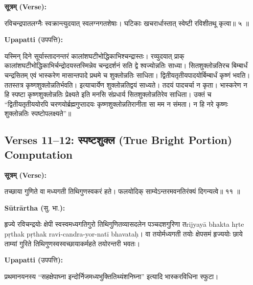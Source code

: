 \documentclass[11pt,a4paper]{article}
\newcommand{\dev}[1]{{\devanagarifont #1}}
\newcommand{\arth}{\textbf{Sūtrārtha (}\dev{सु. भा.}\textbf{):}\ }
\newcommand{\upapatti}{\textbf{Upapatti (}\dev{उपपत्ति}\textbf{):}\ }
\newenvironment{sanskritverse}{%
  \begin{center}\begin{minipage}{0.9\textwidth}
  \setlength{\leftskip}{1em}
  \setlength{\rightskip}{1em}
  \dev
}{\end{minipage}\end{center}}
\begin{document}
\vspace{0.5em}
\noindent\textbf{\dev{सूत्रम् (Verse):}}
\begin{sanskritverse}
रविचन्द्रपातलग्नैः स्वक्रान्त्युदयात् स्वलग्नगतशेषाः।
घटिकाः खचरार्धास्तात् स्वेष्टी रविशीतथू कृत्वा॥ ५ ॥
\end{sanskritverse}

\noindent\upapatti
\begin{sanskritverse}
यस्मिन् दिने सूर्यास्तादनन्तरं कालांशघटीभोद्धिकाभिश्चन्द्रास्तः। रव्युदयात् प्राक्
कालांशघटीभोद्धिकाभिर्चन्द्रोदयस्तस्मिन्नेव चन्द्रदर्शनं सति द्वे श्वज्योन्नतिः साध्या।
सितशुक्लोन्नतिरच बिम्बार्धं चन्द्रसितम् एवं भास्करेण मासान्तपादे प्रथमे च
शुक्लोन्नतिः साधिता। द्वितीयतृतीयपादयोर्बिम्बार्धं कृष्णं भवति। ततस्तत्र
कृष्णशुक्लोन्नतिर्भवति। इत्याचार्येण शुक्लोन्नतिद्वयं साध्यते। तदयं पादचर्चा न
कृता। भास्करेण न हि स्पष्टा कृष्णशुक्लोन्नतिः प्रेक्ष्यते इति मनसि संप्रधार्य
सितशुक्लोन्नतिरेव साधिता। उक्तं च ``द्वितीयतृतीययोरपि चरणयोर्ब्रह्मगुप्तादयः कृष्णशुक्लोन्नतिरानीता सा मम न संमता। न हि नरे कृष्णः शुक्लोन्नतिः स्पष्टोपलक्ष्यते''॥
\end{sanskritverse}

\subsection{Verses 11--12: \dev{स्पष्टशुक्ल} (True Bright Portion) Computation}

\vspace{0.5em}
\noindent\textbf{\dev{सूत्रम् (Verse):}}
\begin{sanskritverse}
तच्छाया गुणिते वा मध्यगती तिथिगुणस्वकरं हते।
फलयोदिक् साम्येऽन्तरमवनतिरंक्यं दिगन्यत्वे॥ ११ ॥
\end{sanskritverse}

\noindent\arth
\begin{sanskritverse}
हृज्ये रविचन्द्रयोः क्षेपी स्वस्वमध्यगतिगुरो तिथिगुणितव्यासदलेन पञ्चदशगुरिणा
तrijyayā bhakta hṛte pṛthak pṛthak ravi-candra-yor-natī bhavataḥ। वा तयोर्मध्यगती
तयोः क्षेपसमं हृज्ययोः छाये ताम्यां गुरिते तिथिगुणस्वस्वच्छायाकर्महते तयोरन्तरी भवतः।
\end{sanskritverse}

\noindent\upapatti
\begin{sanskritverse}
प्रथमानयनस्य ``सहक्षेपाघ्ना इन्दोर्निजमध्यभुक्तितिथ्यंशनिघ्ना'' इत्यादि
भास्करविधिना स्फुटा।
\end{sanskritverse}

\newpage
\end{document}
